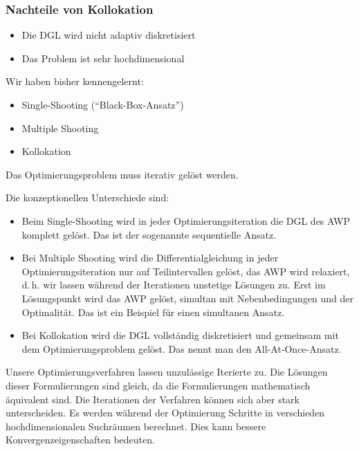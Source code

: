 \subsubsection*{Nachteile von Kollokation}

\begin{itemize}
\item Die DGL wird nicht adaptiv diskretisiert
\item Das Problem ist sehr hochdimensional
\end{itemize}



Wir haben bisher kennengelernt:

\begin{itemize}
\item Single-Shooting ("`Black-Box-Ansatz"')
\item Multiple Shooting 
\item Kollokation
\end{itemize}

Das Optimierungsproblem muss iterativ gelöst werden.

Die konzeptionellen Unterschiede sind:

\begin{itemize}
\item Beim Single-Shooting wird in jeder Optimierungsiteration die DGL des AWP komplett gelöst. Das ist der sogenannte sequentielle Ansatz.
\item Bei Multiple Shooting wird die Differentialgleichung in jeder Optimierungsiteration nur auf Teilintervallen gelöst, das AWP wird relaxiert, d.\,h. wir lassen während der Iterationen unstetige Lösungen zu. Erst im Lösungspunkt wird das AWP gelöst, simultan mit Nebenbedingungen und der Optimalität. Das ist ein Beispiel für einen simultanen Ansatz.
\item Bei Kollokation wird die DGL vollständig diskretisiert und gemeinsam mit dem Optimierungsproblem gelöst. Das nennt man den All-At-Once-Ansatz.
\end{itemize}

Unsere Optimierungsverfahren lassen unzulässige Iterierte zu. Die Lösungen dieser Formulierungen sind gleich, da die Formulierungen mathematisch äquivalent sind. Die Iterationen der Verfahren können sich aber stark unterscheiden. Es werden während der Optimierung Schritte in verschieden hochdimensionalen Suchräumen berechnet. Dies kann bessere Konvergenzeigenschaften bedeuten.

